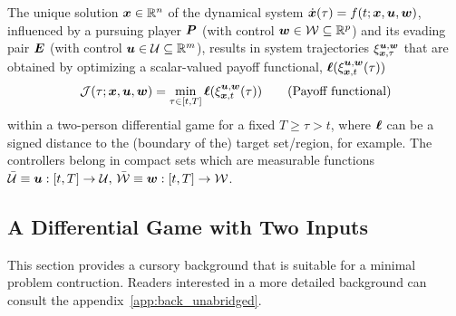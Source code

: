 The unique solution $\bm{x} \in \mathbb{R}^n$ of the dynamical system $\dot{\bm{x}}(\tau) = f(t; \bm{x},  \bm{u}, \bm{w})$, influenced by a pursuing player $\bm{P}$ (with control $\bm{w} \in \mathcal{W}  \subseteq \mathbb{R}^p$) and its evading pair $\bm{E}$ (with control $\bm{u} \in \mathcal{U} \subseteq \mathbb{R}^m$),  results in system trajectories $\xi_{\bm{x}, \tau}^{\bm{u}, \bm{w}}$ that are obtained by optimizing a scalar-valued payoff functional, $\bm{\ell}(\xi_{\bm{x},t}^{\bm{u}, \bm{w}}(\tau))$ \ie
%
\begin{align}
	\mathcal{J}(\tau; \bm{x}, \bm{u}, \bm{w}) = \min_{\tau \in [t, T]} \bm{\ell}(\xi_{\bm{x},t}^{\bm{u}, \bm{w}}(\tau))
	\tag{Payoff functional}
	\label{eq:distance}
\end{align} 
%
within a two-person differential game for a fixed $T \ge \tau > t$, where $\bm{\ell}$ can be a signed distance to the (boundary of the) target set/region, for example. The controllers belong in compact sets which are  measurable functions \ie $\bar{\mathcal{U}} \equiv \bm{u}: [t, T] \rightarrow \mathcal{U}, \, \bar{\mathcal{W}} \equiv  \bm{w}: [t, T] \rightarrow \mathcal{W}$.
%
%
%
%

\subsection{A Differential Game with Two Inputs}
This section provides a cursory background that is suitable for a minimal problem contruction. Readers interested in a more detailed background can consult the appendix~\ref{app:back_unabridged}. 

